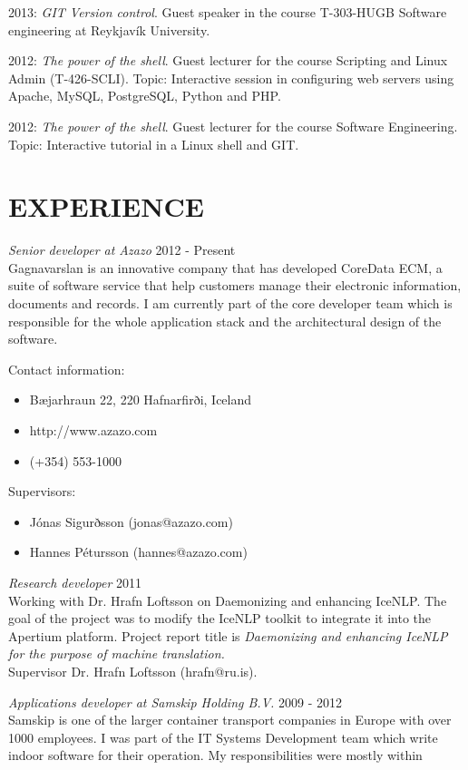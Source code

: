 \documentclass[margin]{res}
\begin{document}
\begin{resume}
2013: \emph{GIT Version control}. Guest speaker in the course T-303-HUGB Software engineering at Reykjavík University.

2012: \emph{The power of the shell}. Guest lecturer for the course Scripting and Linux Admin (T-426-SCLI). Topic: Interactive session in configuring web servers using Apache, MySQL, PostgreSQL, Python and PHP.

2012: \emph{The power of the shell}. Guest lecturer for the course Software Engineering. Topic: Interactive tutorial in a Linux shell and GIT. 

 

\section{EXPERIENCE}
{\sl Senior developer at Azazo} \hfill 2012 - Present \\
Gagnavarslan is an innovative company that has developed CoreData ECM, a suite of software service that help customers manage their electronic information, documents and records. 
I am currently part of the core developer team which is responsible for the whole application stack and the architectural design of the software.

Contact information:
\begin{itemize}\itemsep -3pt
\item Bæjarhraun 22, 220 Hafnarfirði, Iceland
\item http://www.azazo.com
\item (+354) 553-1000
\end{itemize}

Supervisors:
\begin{itemize} \itemsep -3pt
 \item Jónas Sigurðsson (jonas@azazo.com)
 \item Hannes Pétursson (hannes@azazo.com)
\end{itemize}

{\sl Research developer} \hfill 2011 \\
Working with Dr. Hrafn Loftsson on Daemonizing and enhancing IceNLP. The goal
of the project was to modify the IceNLP toolkit to integrate it into the
Apertium platform.  Project report title is \emph{Daemonizing and enhancing
IceNLP for the purpose of machine translation.}\\ Supervisor Dr. Hrafn Loftsson
(hrafn@ru.is).

{\sl Applications developer at Samskip Holding B.V.} \hfill 2009 - 2012 \\
Samskip is one of the larger container transport companies in Europe with over
1000 employees. I was part of the IT Systems Development team which write
indoor software for their operation. My responsibilities were mostly within 


\end{resume}
\end{document}
